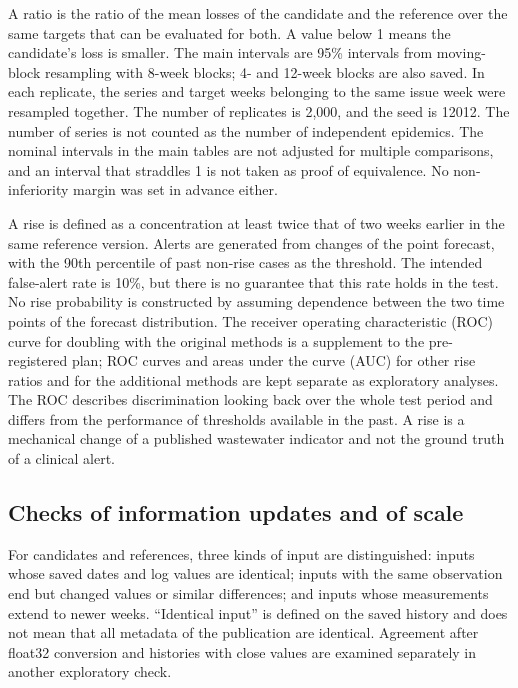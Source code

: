 \documentclass[11pt]{article}
\begin{document}
A ratio is the ratio of the mean losses of the candidate and the reference over the same targets that can be evaluated for both. A value below 1 means the candidate's loss is smaller. The main intervals are 95\% intervals from moving-block resampling with 8-week blocks; 4- and 12-week blocks are also saved. In each replicate, the series and target weeks belonging to the same issue week were resampled together. The number of replicates is 2,000, and the seed is 12012. The number of series is not counted as the number of independent epidemics. The nominal intervals in the main tables are not adjusted for multiple comparisons, and an interval that straddles 1 is not taken as proof of equivalence. No non-inferiority margin was set in advance either.

A rise is defined as a concentration at least twice that of two weeks earlier in the same reference version. Alerts are generated from changes of the point forecast, with the 90th percentile of past non-rise cases as the threshold. The intended false-alert rate is 10\%, but there is no guarantee that this rate holds in the test. No rise probability is constructed by assuming dependence between the two time points of the forecast distribution. The receiver operating characteristic (ROC) curve for doubling with the original methods is a supplement to the pre-registered plan; ROC curves and areas under the curve (AUC) for other rise ratios and for the additional methods are kept separate as exploratory analyses. The ROC describes discrimination looking back over the whole test period and differs from the performance of thresholds available in the past. A rise is a mechanical change of a published wastewater indicator and not the ground truth of a clinical alert.

\subsection{Checks of information updates and of scale}

For candidates and references, three kinds of input are distinguished: inputs whose saved dates and log values are identical; inputs with the same observation end but changed values or similar differences; and inputs whose measurements extend to newer weeks. ``Identical input'' is defined on the saved history and does not mean that all metadata of the publication are identical. Agreement after float32 conversion and histories with close values are examined separately in another exploratory check.
\end{document}
